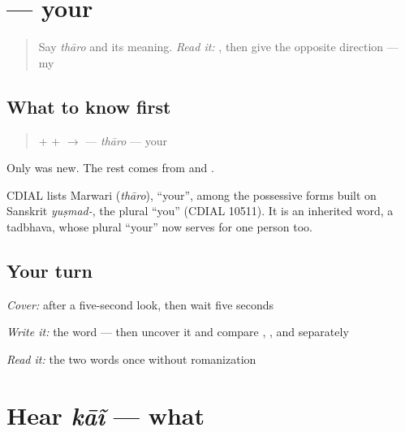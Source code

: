 \section[\texorpdfstring{\mw{थारो} (thāro)}{थारो (thāro)}]{ — your}

\label{lesson:MW-C05-tharo}



\begin{quote}
Say \emph{thāro} and its meaning. \emph{Read it:} \textbf{}, then give the opposite direction — my
\end{quote}

\subsection*{What to know first}
\begin{quote}
\textbf{} + \textbf{} + \textbf{} $\to$ \textbf{} — \emph{thāro} — your
\end{quote}

Only \textbf{} was new. The rest comes from \textbf{} and \textbf{}.

\begin{cousinweb}
CDIAL lists Marwari \textbf{} (\emph{thāro}), \textquotedblleft{}your\textquotedblright{}, among the possessive forms built on Sanskrit \emph{yuṣmad-}, the plural \textquotedblleft{}you\textquotedblright{} (CDIAL 10511). It is an inherited word, a tadbhava, whose plural \textquotedblleft{}your\textquotedblright{} now serves for one person too.
\end{cousinweb}

\subsection*{Your turn}
\emph{Cover:} \textbf{} after a five-second look, then wait five seconds

\emph{Write it:} the word — then uncover it and compare \textbf{}, \textbf{}, and \textbf{} separately

\begin{tcolorbox}[breakable,colback=teal!4,colframe=teal!35!black,title={Before you move on}]
\emph{Read it:} the two words once without romanization
\end{tcolorbox}
\section[kāĩ]{Hear \emph{kāĩ} — what}

